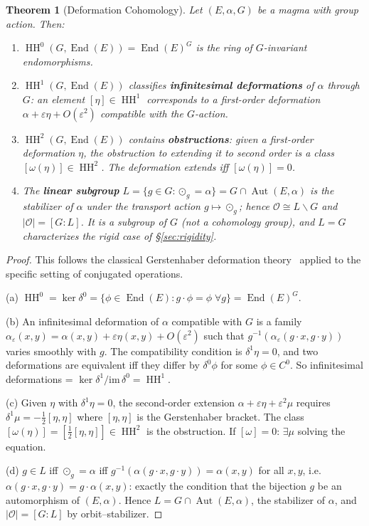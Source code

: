 \documentclass[11pt,twocolumn]{article}
\theoremstyle{plain}\newtheorem{theorem}{Theorem}\newtheorem{proposition}[theorem]{Proposition}\newtheorem{corollary}[theorem]{Corollary}\newtheorem{lemma}[theorem]{Lemma}
\theoremstyle{definition}\newtheorem{definition}[theorem]{Definition}\newtheorem{example}[theorem]{Example}
\theoremstyle{remark}\newtheorem{remark}[theorem]{Remark}
\newcommand{\HH}{\operatorname{HH}}
\newcommand{\Aut}{\operatorname{Aut}}
\newcommand{\End}{\operatorname{End}}
\begin{document}
\begin{theorem}[Deformation Cohomology]\label{thm:cohom}
Let $(E, \alpha, G)$ be a magma with group action. Then:
\begin{enumerate}[label=(\alph*)]
    \item $\HH^0(G, \End(E)) = \End(E)^G$ is the ring of $G$-invariant endomorphisms.
    \item $\HH^1(G, \End(E))$ classifies \textbf{infinitesimal deformations} of $\alpha$ through $G$: an element $[\eta] \in \HH^1$ corresponds to a first-order deformation $\alpha + \varepsilon\eta + O(\varepsilon^2)$ compatible with the $G$-action.
    \item $\HH^2(G, \End(E))$ contains \textbf{obstructions}: given a first-order deformation $\eta$, the obstruction to extending it to second order is a class $[\omega(\eta)] \in \HH^2$. The deformation extends iff $[\omega(\eta)] = 0$.
    \item The \textbf{linear subgroup} $L = \{g \in G : \odot_g = \alpha\} = G \cap \Aut(E, \alpha)$ is the stabilizer of $\alpha$ under the transport action $g \mapsto \odot_g$; hence $\mathcal{O} \cong L\backslash G$ and $|\mathcal{O}| = [G:L]$. It is a subgroup of $G$ (not a cohomology group), and $L = G$ characterizes the rigid case of \S\ref{sec:rigidity}.
\end{enumerate}
\end{theorem}

\begin{proof}
This follows the classical Gerstenhaber deformation theory~\cite{gerstenhaber1964} applied to the specific setting of conjugated operations.

(a) $\HH^0 = \ker\delta^0 = \{\phi \in \End(E) : g \cdot \phi = \phi \;\forall g\} = \End(E)^G$.

(b) An infinitesimal deformation of $\alpha$ compatible with $G$ is a family $\alpha_\varepsilon(x,y) = \alpha(x,y) + \varepsilon\eta(x,y) + O(\varepsilon^2)$ such that $g^{-1}(\alpha_\varepsilon(g \cdot x, g \cdot y))$ varies smoothly with $g$. The compatibility condition is $\delta^1\eta = 0$, and two deformations are equivalent iff they differ by $\delta^0\phi$ for some $\phi \in C^0$. So infinitesimal deformations = $\ker\delta^1/\mathrm{im}\,\delta^0 = \HH^1$.

(c) Given $\eta$ with $\delta^1\eta = 0$, the second-order extension $\alpha + \varepsilon\eta + \varepsilon^2\mu$ requires $\delta^1\mu = -\frac{1}{2}[\eta, \eta]$ where $[\eta, \eta]$ is the Gerstenhaber bracket. The class $[\omega(\eta)] = [\frac{1}{2}[\eta,\eta]] \in \HH^2$ is the obstruction. If $[\omega] = 0$: $\exists \mu$ solving the equation.

(d) $g \in L$ iff $\odot_g = \alpha$ iff $g^{-1}(\alpha(g \cdot x, g \cdot y)) = \alpha(x,y)$ for all $x,y$, i.e.\ $\alpha(g \cdot x, g \cdot y) = g \cdot \alpha(x,y)$: exactly the condition that the bijection $g$ be an automorphism of $(E, \alpha)$. Hence $L = G \cap \Aut(E, \alpha)$, the stabilizer of $\alpha$, and $|\mathcal{O}| = [G:L]$ by orbit--stabilizer.
\end{proof}
\end{document}
